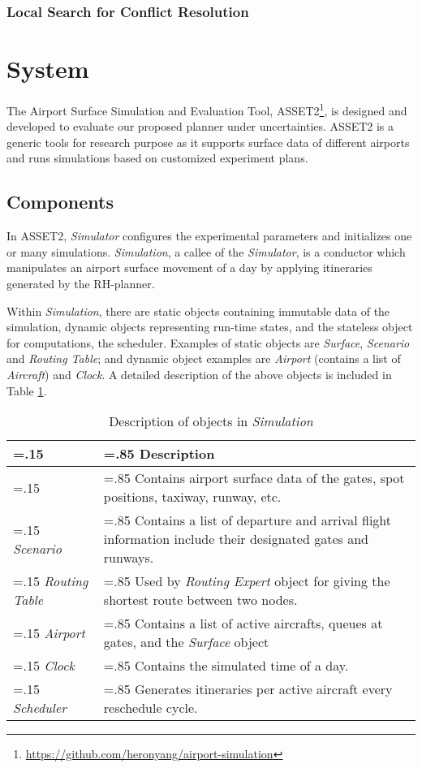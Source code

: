 \documentclass[letterpaper, 10 pt, conference]{ieeeconf}
\begin{document}
\subsubsection{Local Search for Conflict Resolution}

\section{System}

The Airport Surface Simulation and Evaluation Tool, ASSET2\footnote{\url{https://github.com/heronyang/airport-simulation}}, is designed and developed to evaluate our proposed planner under uncertainties. ASSET2 is a generic tools for research purpose as it supports surface data of different airports and runs simulations based on customized experiment plans.

\subsection{Components}

In ASSET2, {\it Simulator} configures the experimental parameters and initializes one or many simulations. {\it Simulation}, a callee of the {\it Simulator}, is a conductor which manipulates an airport surface movement of a day by applying itineraries generated by the RH-planner.

Within {\it Simulation}, there are static objects containing immutable data of the simulation, dynamic objects representing run-time states, and the stateless object for computations, the scheduler. Examples of static objects are {\it Surface}, {\it Scenario} and {\it Routing Table}; and dynamic object examples are {\it Airport} (contains a list of {\it Aircraft}) and {\it Clock}. A detailed description of the above objects is included in Table \ref{simulation-objects}.

\begin{table}[htbp]
\centering
\begin{tabularx}{\linewidth}{
    |>{\hsize=.15\hsize}X
    |>{\hsize=.85\hsize}X|}
\hline
 & {\bf Description} \\ \hline
{\it Surface} & Contains airport surface data of the gates, spot positions, taxiway, runway, etc. \\ \hline
{\it Scenario} & Contains a list of departure and arrival flight information include their designated gates and runways. \\ \hline
{\it Routing Table} & Used by {\it Routing Expert} object for giving the shortest route between two nodes. \\ \hline
{\it Airport} & Contains a list of active aircrafts, queues at gates, and the {\it Surface} object \\ \hline
{\it Clock} &  Contains the simulated time of a day. \\ \hline
{\it Scheduler}  & Generates itineraries per active aircraft every reschedule cycle. \\ \hline
\end{tabularx}
\label{simulation-objects}
\caption{Description of objects in {\it Simulation}}
\end{table}
\end{document}
